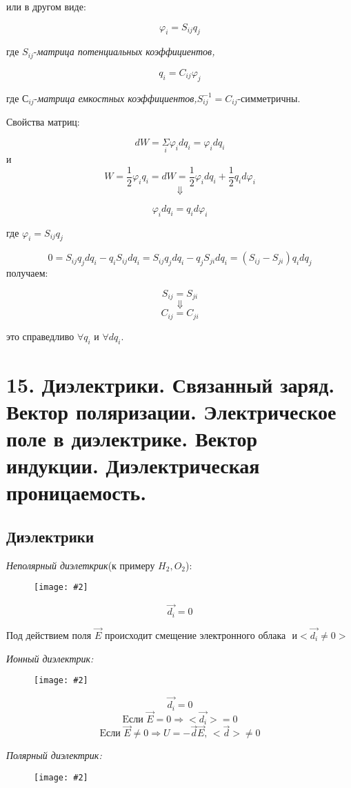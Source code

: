 \documentclass[a4paper,12pt]{article}
\newcommand{\kr}[1]{\textit{#1}}
\newcommand{\fc}[1]{\[#1\]}
\newcommand{\imc}[2][0.7\textwidth]{%
    \begin{figure}[h!]
        \centering
        \texttt{[image: \#2]}
    \end{figure}%
}
\begin{document}
или в другом виде:

\fc{\varphi_{i}=S_{ij}q_{j}}

где $S_{ij}$-\kr{матрица потенциальных коэффициентов,}

\fc{q_{i}=C_{ij}\varphi_j}

где $С_{ij}$-\kr{матрица емкостных коэффициентов,}$S_{ij}^{-1}=C_{ij}$-симметричны.

Свойства матриц:

\fc{dW=\underset{i}{\Sigma}\varphi_i dq_i=\varphi_i dq_i}
и
\fc{W=\frac{1}{2}\varphi_i q_i=dW=\frac{1}{2}\varphi_i dq_i+\frac{1}{2}q_id\varphi_i}
\fc{\Downarrow}

\fc{\varphi_idq_i=q_id\varphi_i}

где $\varphi_i=S_{ij}q_j$

\fc{0=S_{i j} q_j d q_i-q_i S_{i j} d q_i=S_{i j} q_j  d q_i-q_j S_{j i} d q_i=(S_{i j}-S_{ji})q_idq_j}
получаем:

\fc{S_{ij}=S_{ji}}
\fc{\Downarrow}
\fc{C_{ij}=C_{ji}}

это справедливо $\forall q_i$ и $\forall dq_i$.

\newpage

\section*{15. Диэлектрики. Связанный заряд. Вектор поляризации. Электрическое поле
в диэлектрике. Вектор индукции. Диэлектрическая проницаемость.}

\subsection*{Диэлектрики}

\kr{Неполярный диэлеткрик}(к примеру $H_2,O_2$):

\imc[0.3\textwidth]{29.png}

\fc{\vec{d_i}=0}

Под действием поля $\vec{E}$ происходит смещение электронного облака
 $\text{ и}<\vec{d_i}\neq0>$

\kr{Ионный диэлектрик:}

\imc[0.4\textwidth]{30.png}

\fc{\vec{d_i}=0}
\fc{\text{Eсли }\vec{E}=0\Rightarrow <\vec{d_i}>=0}
\fc{\text{Eсли }\vec{E}\neq0\Rightarrow U=-\vec{d}\vec{E}\text{, }<\vec{d}>\neq0}

\newpage

\kr{Полярный диэлектрик:}

\imc[0.25\textwidth]{31.png}
\end{document}
